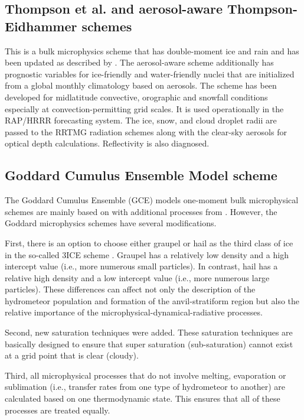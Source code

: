 \subsection{Thompson et al. and aerosol-aware Thompson-Eidhammer schemes}
This is a bulk microphysics scheme that has double-moment ice and rain and has been updated as described by \citet{thompson08}. The aerosol-aware scheme \citep{thompson14}
additionally has prognostic variables for ice-friendly and water-friendly nuclei that are initialized from a global monthly climatology based on aerosols. The scheme has been developed for midlatitude convective, orographic and snowfall conditions especially at convection-permitting grid scales. It is used operationally in the RAP/HRRR forecasting system. The ice, snow,
and cloud droplet radii are passed to the RRTMG radiation schemes along with the clear-sky aerosols for optical depth calculations. Reflectivity is also diagnosed.

\subsection{Goddard Cumulus Ensemble Model scheme}

The Goddard Cumulus Ensemble (GCE) models \citep{tao93} one-moment bulk microphysical schemes  are mainly based on \citet{lin83} with additional processes from \citet{rutledge84}.  However, the Goddard microphysics schemes have several modifications. 

First, there is an option to choose either graupel or hail as the third class of ice in the so-called 3ICE scheme \citep{mccumber91}.  Graupel has a relatively low density and a high intercept value (i.e., more numerous small particles).  In contrast, hail has a relative high density and a low intercept value (i.e., more numerous large particles).  These differences can affect not only the description of the hydrometeor population and formation of the anvil-stratiform region but also the relative importance of the microphysical-dynamical-radiative processes. 

Second, new saturation techniques \citep{tao89, tao03} were added.  These saturation techniques are basically designed to ensure that super saturation (sub-saturation) cannot exist at a grid point that is clear (cloudy).  

Third, all microphysical processes that do not involve melting, evaporation or sublimation (i.e., transfer rates from one type of hydrometeor to another) are calculated based on one thermodynamic state.  This ensures that all of these processes are treated equally. 

